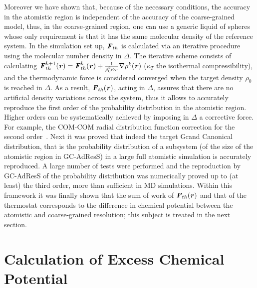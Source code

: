 \documentclass[a4paper,preprint,unsortedaddress]{revtex4-1}
\newcommand{\recheck}[1]{{\color{red} #1}}
\newcommand{\vect}[1]{\textbf{\textit{#1}}}
\begin{document}
Moreover we have shown that, because of the necessary conditions, the accuracy in the atomistic region is independent of the accuracy of the coarse-grained model, thus, in the coarse-grained region, one can use a generic liquid of spheres whose only requirement is that it has the same molecular density of the reference system. In the simulation set up, ${\vect F}_{th}$ is calculated via an iterative procedure \recheck{using} the molecular number density in $\Delta$. The iterative scheme consists of calculating \recheck{${\vect F}^{k+1}_{th}({\vect r}) = {\vect F}^{k}_{th}({\vect r}) + \frac{1}{\rho^2_{0}\kappa_{T}}\nabla \rho^{k}({\vect r})$} ($\kappa_{T}$ the isothermal compressibility), and the thermodynamic force is considered converged when the target density $\rho_{0}$ is reached in $\Delta$. As a result, ${\vect F}_{th}({\vect r})$, acting in $\Delta$, assures that there are no artificial density variations across the system, thus it allows to accurately reproduce the first order of the probability distribution in the atomistic region. Higher orders can be systematically achieved by imposing in $\Delta$ a corrective force.
\recheck{For example, the COM-COM radial distribution function correction for the second order~\cite{jctchan}.} Next it was proved that indeed the target Grand Canonical distribution, that is the probability distribution of a subsystem (of the size of the atomistic region in GC-AdResS) in a large full atomistic simulation is accurately reproduced. A large number of tests were performed and the reproduction by GC-AdResS of the probability distribution was numerically proved up to (at least) the third order, more than sufficient in MD simulations. Within this framework it was finally shown that the sum of work of ${\vect F}_{th}({\vect r})$ and that of the thermostat corresponds to the difference in chemical potential between the atomistic and coarse-grained resolution; this subject is treated in the next section.


\section{Calculation of Excess Chemical Potential}
\end{document}
